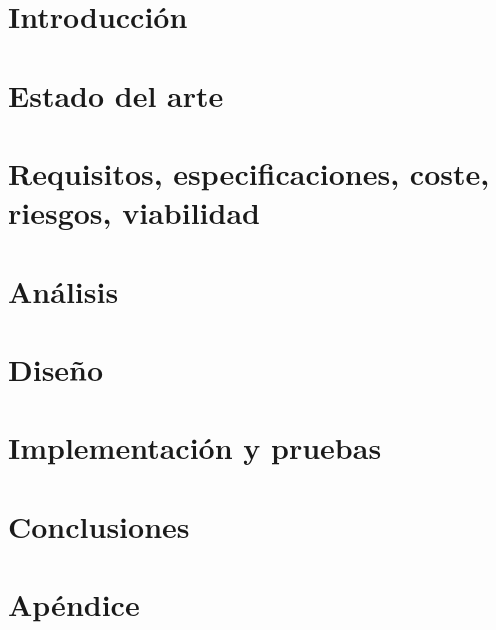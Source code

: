 \documentclass[twoside,spanish,a4paper,12pt]{tfg}
\begin{document}
	\pagestyle{tfg}
	\justify
	
	
	
	\chapter{Introducción}
	
	
	\chapter{Estado del arte}
	
	
	\chapter{Requisitos, especificaciones, coste, riesgos, viabilidad}
	
	
	\chapter{Análisis}
	
	
	\chapter{Diseño}
	
	
	\chapter{Implementación y pruebas}
	
	
	\chapter{Conclusiones}
	
	
	
	
	\pagestyle{appendix}
	
	\appendix
	\chapter{Apéndice}
	
	
	
	
	
	
	
	
\end{document}
